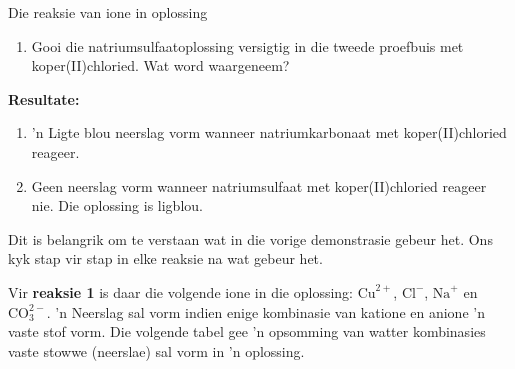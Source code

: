 \begin{g_experiment}{Die reaksie van ione in oplossing}
\begin{enumerate}[noitemsep, label=\textbf{\arabic*}. ]
\label{m38719*uid64}\item Gooi die natriumsulfaatoplossing versigtig in die tweede proefbuis met koper(II)chloried. Wat word waargeneem?
\end{enumerate}
        \par 
      \label{m38719*id340060}\noindent{}\textbf{Resultate:}
        \newline
      \label{m38719*id340067}\begin{enumerate}[noitemsep, label=\textbf{\arabic*}. ] 
            \label{m38719*uid65}\item 'n Ligte blou neerslag vorm wanneer natriumkarbonaat met koper(II)chloried reageer.
\label{m38719*uid66}\item Geen neerslag vorm wanneer natriumsulfaat met koper(II)chloried reageer nie. Die oplossing is ligblou.
\end{enumerate}
        \par 
\end{g_experiment}
      \label{m38719*id340106}Dit is belangrik om te verstaan wat in die vorige demonstrasie gebeur het.  Ons kyk stap vir stap in elke reaksie na wat gebeur het.\par 
Vir \textbf{reaksie 1} is daar die volgende ione in die oplossing: ${\text{Cu}}^{2+}$, ${\text{Cl}}^{-}$, ${\text{Na}}^{+}$ en $\text{CO}_{3}^{2-}$.  'n Neerslag sal vorm indien enige kombinasie van katione en anione 'n vaste stof vorm. Die volgende tabel gee 'n opsomming van watter kombinasies vaste stowwe (neerslae) sal vorm in 'n oplossing. 
